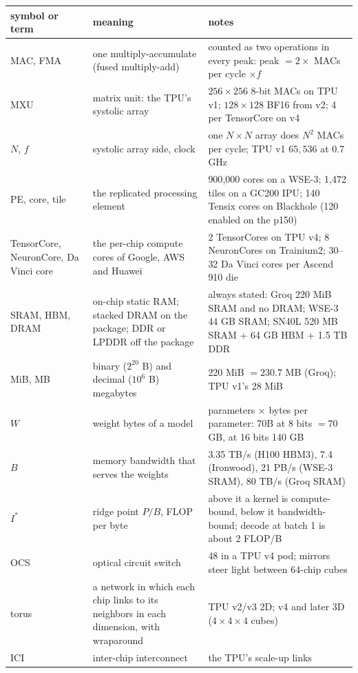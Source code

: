 \documentclass[11pt,letterpaper]{article}
\begin{document}
\begin{center}\scriptsize\setlength{\tabcolsep}{4pt}\renewcommand{\arraystretch}{1.05}
\begin{tabular}{@{}lp{4.5cm}p{6.9cm}@{}}
\toprule
symbol or term & meaning & notes\\
\midrule
MAC, FMA & one multiply-accumulate (fused multiply-add) & counted as two operations in every peak: peak $= 2\times$ MACs per cycle $\times f$\\
MXU & matrix unit: the TPU's systolic array & $256\times256$ 8-bit MACs on TPU v1; $128\times128$ BF16 from v2; 4 per TensorCore on v4\\
$N$, $f$ & systolic array side, clock & one $N\times N$ array does $N^2$ MACs per cycle; TPU v1 $65{,}536$ at 0.7 GHz\\
PE, core, tile & the replicated processing element & 900{,}000 cores on a WSE-3; 1{,}472 tiles on a GC200 IPU; 140 Tensix cores on Blackhole (120 enabled on the p150)\\
TensorCore, NeuronCore, Da Vinci core & the per-chip compute cores of Google, AWS and Huawei & 2 TensorCores on TPU v4; 8 NeuronCores on Trainium2; 30--32 Da Vinci cores per Ascend 910 die\\
SRAM, HBM, DRAM & on-chip static RAM; stacked DRAM on the package; DDR or LPDDR off the package & always stated: Groq 220 MiB SRAM and no DRAM; WSE-3 44 GB SRAM; SN40L 520 MB SRAM $+$ 64 GB HBM $+$ 1.5 TB DDR\\
MiB, MB & binary ($2^{20}$ B) and decimal ($10^6$ B) megabytes & 220 MiB $= 230.7$ MB (Groq); TPU v1's 28 MiB\\
$W$ & weight bytes of a model & parameters $\times$ bytes per parameter: 70B at 8 bits $= 70$ GB, at 16 bits 140 GB\\
$B$ & memory bandwidth that serves the weights & 3.35 TB/s (H100 HBM3), 7.4 (Ironwood), 21 PB/s (WSE-3 SRAM), 80 TB/s (Groq SRAM)\\
$I^\ast$ & ridge point $P/B$, FLOP per byte & above it a kernel is compute-bound, below it bandwidth-bound; decode at batch 1 is about 2 FLOP/B\\
OCS & optical circuit switch & 48 in a TPU v4 pod; mirrors steer light between 64-chip cubes\\
torus & a network in which each chip links to its neighbors in each dimension, with wraparound & TPU v2/v3 2D; v4 and later 3D ($4\times4\times4$ cubes)\\
ICI & inter-chip interconnect & the TPU's scale-up links\\

\end{tabular}
\end{center}
\end{document}
